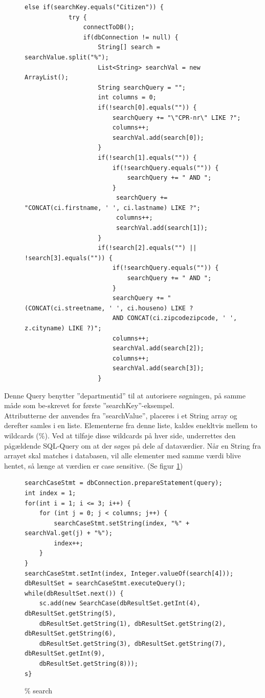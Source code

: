 \begin{figure} [htb!]
\begin{lstlisting}
else if(searchKey.equals("Citizen")) {
            try {
                connectToDB();
                if(dbConnection != null) {
                    String[] search = searchValue.split("%");
                    List<String> searchVal = new ArrayList();
                    String searchQuery = "";
                    int columns = 0;
                    if(!search[0].equals("")) {
                        searchQuery += "\"CPR-nr\" LIKE ?";
                        columns++;
                        searchVal.add(search[0]);
                    } 
                    if(!search[1].equals("")) {
                        if(!searchQuery.equals("")) {
                            searchQuery += " AND ";
                        }
                         searchQuery += "CONCAT(ci.firstname, ' ', ci.lastname) LIKE ?";
                         columns++;
                         searchVal.add(search[1]);
                    } 
                    if(!search[2].equals("") || !search[3].equals("")) {
                        if(!searchQuery.equals("")) {
                            searchQuery += " AND ";
                        }
                        searchQuery += "(CONCAT(ci.streetname, ' ', ci.houseno) LIKE ?
                        AND CONCAT(ci.zipcodezipcode, ' ', z.cityname) LIKE ?)";
                        columns++;
                        searchVal.add(search[2]);
                        columns++;
                        searchVal.add(search[3]);
                    }
\end{lstlisting}
\end{figure}
\newpage
Denne Query benytter ”departmentid” til at autorisere søgningen, på samme måde som be-skrevet for første ”searchKey”-eksempel.\\
Attributterne der anvendes fra ”searchValue”, placeres i et String array og derefter samles i en liste. Elementerne fra denne liste, kaldes enekltvis mellem to wildcards (\%). Ved at tilføje disse wildcards på hver side, underrettes den pågældende SQL-Query om at der søges på dele af dataværdier. Når en String fra arrayet skal matches i databasen, vil alle elementer med samme værdi blive hentet, så længe at værdien er case sensitive.
(Se figur \ref{code:wild})\\
\begin{figure}
\begin{lstlisting}
searchCaseStmt = dbConnection.prepareStatement(query);
int index = 1;
for(int i = 1; i <= 3; i++) {
	for (int j = 0; j < columns; j++) {
		searchCaseStmt.setString(index, "%" + searchVal.get(j) + "%");
		index++;
	}
}
searchCaseStmt.setInt(index, Integer.valueOf(search[4]));
dbResultSet = searchCaseStmt.executeQuery();
while(dbResultSet.next()) {
	sc.add(new SearchCase(dbResultSet.getInt(4), dbResultSet.getString(5), 
	dbResultSet.getString(1), dbResultSet.getString(2), dbResultSet.getString(6), 
	dbResultSet.getString(3), dbResultSet.getString(7), dbResultSet.getInt(9), 
	dbResultSet.getString(8)));
s}
\end{lstlisting}
\caption{\% search}
\label{code:wild}
\end{figure}
